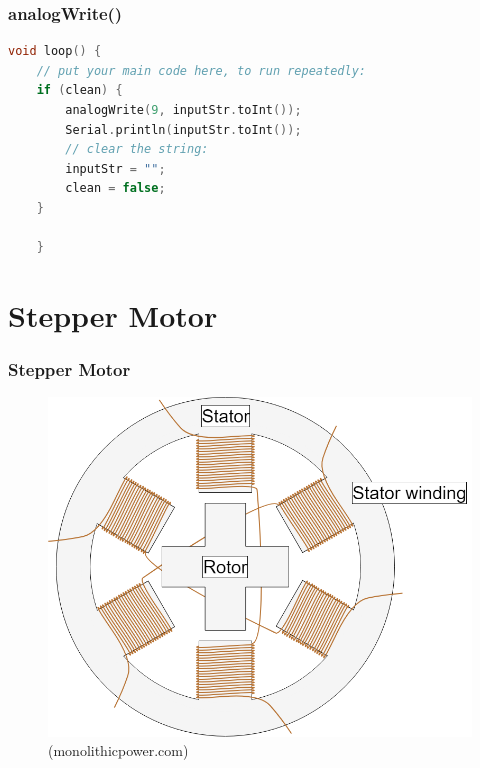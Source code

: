 \documentclass[compress, aspectratio=32]{beamer}
\begin{document}
\begin{frame}[fragile]
    \frametitle{analogWrite()}
    \begin{lstlisting}[language=c]
void loop() {
    // put your main code here, to run repeatedly:
    if (clean) {
        analogWrite(9, inputStr.toInt());
        Serial.println(inputStr.toInt());
        // clear the string:
        inputStr = "";
        clean = false;
    }
    
    }
    \end{lstlisting}
\end{frame}

\section{Stepper Motor}
\begin{frame}
    \frametitle{Stepper Motor}
    \begin{figure}
        \centering
        \includegraphics[height=0.7\textheight]{stepper.png}
        \caption*{(monolithicpower.com)}
    \end{figure}
\end{frame}
\end{document}
